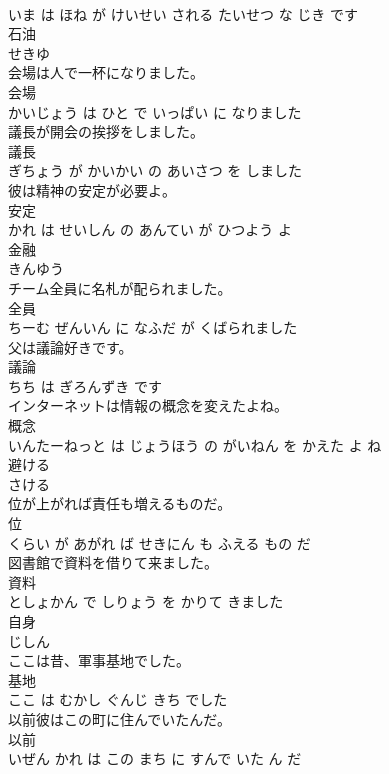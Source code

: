 \documentclass[8pt]{extreport}
\begin{document}
\begin{CJK}{UTF8}{min}
\\	いま は ほね が けいせい される たいせつ な じき です			
\\	石油	
\\	せきゆ			
\\	会場は人で一杯になりました。	
\\	会場 
\\	かいじょう は ひと で いっぱい に なりました			
\\	議長が開会の挨拶をしました。	
\\	議長 
\\	ぎちょう が かいかい の あいさつ を しました			
\\	彼は精神の安定が必要よ。	
\\	安定 
\\	かれ は せいしん の あんてい が ひつよう よ			
\\	金融	
\\	きんゆう			
\\	チーム全員に名札が配られました。	
\\	全員 
\\	ちーむ ぜんいん に なふだ が くばられました			
\\	父は議論好きです。	
\\	議論 
\\	ちち は ぎろんずき です			
\\	インターネットは情報の概念を変えたよね。	
\\	概念 
\\	いんたーねっと は じょうほう の がいねん を かえた よ ね			
\\	避ける	
\\	さける			
\\	位が上がれば責任も増えるものだ。	
\\	位 
\\	くらい が あがれ ば せきにん も ふえる もの だ			
\\	図書館で資料を借りて来ました。	
\\	資料 
\\	としょかん で しりょう を かりて きました			
\\	自身	
\\	じしん			
\\	ここは昔、軍事基地でした。	
\\	基地 
\\	ここ は むかし ぐんじ きち でした			
\\	以前彼はこの町に住んでいたんだ。	
\\	以前 
\\	いぜん かれ は この まち に すんで いた ん だ			

\end{CJK}
\end{document}
